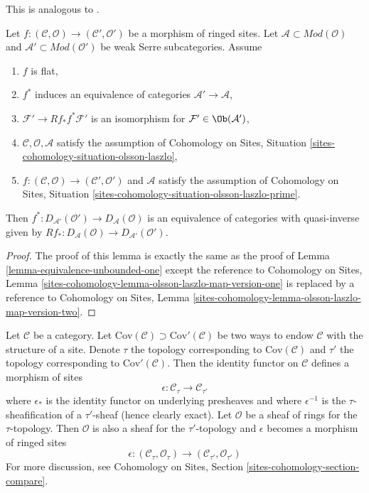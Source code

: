 \begin{lemma}
\label{lemma-equivalence-unbounded-two}
\begin{reference}
This is analogous to \cite[Theorem 2.2.3]{six-I}.
\end{reference}
Let $f : (\mathcal{C}, \mathcal{O}) \to (\mathcal{C}', \mathcal{O}')$
be a morphism of ringed sites.
Let $\mathcal{A} \subset \textit{Mod}(\mathcal{O})$
and $\mathcal{A}' \subset \textit{Mod}(\mathcal{O}')$
be weak Serre subcategories. Assume
\begin{enumerate}
\item $f$ is flat,
\item $f^*$ induces an equivalence of categories
$\mathcal{A}' \to \mathcal{A}$,
\item $\mathcal{F}' \to Rf_*f^*\mathcal{F}'$ is an isomorphism
for $\mathcal{F}' \in \Ob(\mathcal{A}')$,
\item $\mathcal{C}, \mathcal{O}, \mathcal{A}$ satisfy the
assumption of
Cohomology on Sites, Situation \ref{sites-cohomology-situation-olsson-laszlo},
\item $f : (\mathcal{C}, \mathcal{O}) \to (\mathcal{C}', \mathcal{O}')$
and $\mathcal{A}$ satisfy the assumption of
Cohomology on Sites, Situation
\ref{sites-cohomology-situation-olsson-laszlo-prime}.
\end{enumerate}
Then $f^* : D_{\mathcal{A}'}(\mathcal{O}') \to D_\mathcal{A}(\mathcal{O})$
is an equivalence of categories with quasi-inverse given by
$Rf_* : D_\mathcal{A}(\mathcal{O}) \to D_{\mathcal{A}'}(\mathcal{O}')$.
\end{lemma}

\begin{proof}
The proof of this lemma is exactly the same as the proof
of Lemma \ref{lemma-equivalence-unbounded-one}
except the reference to
Cohomology on Sites, Lemma
\ref{sites-cohomology-lemma-olsson-laszlo-map-version-one}
is replaced by a reference to
Cohomology on Sites, Lemma
\ref{sites-cohomology-lemma-olsson-laszlo-map-version-two}.
\end{proof}


\noindent
Let $\mathcal{C}$ be a category. Let
$\text{Cov}(\mathcal{C}) \supset \text{Cov}'(\mathcal{C})$
be two ways to endow $\mathcal{C}$ with the structure of a site.
Denote $\tau$ the topology corresponding to $\text{Cov}(\mathcal{C})$
and $\tau'$ the topology corresponding to $\text{Cov}'(\mathcal{C})$.
Then the identity functor on $\mathcal{C}$ defines a morphism
of sites
$$
\epsilon : \mathcal{C}_\tau \longrightarrow \mathcal{C}_{\tau'}
$$
where $\epsilon_*$ is the identity functor on underlying presheaves and
where $\epsilon^{-1}$ is the $\tau$-sheafification of a $\tau'$-sheaf
(hence clearly exact). Let $\mathcal{O}$ be a sheaf of rings for the
$\tau$-topology. Then $\mathcal{O}$ is also a sheaf for the $\tau'$-topology
and $\epsilon$ becomes a morphism of ringed sites
$$
\epsilon :
(\mathcal{C}_\tau, \mathcal{O}_\tau)
\longrightarrow
(\mathcal{C}_{\tau'}, \mathcal{O}_{\tau'})
$$
For more discussion, see
Cohomology on Sites, Section \ref{sites-cohomology-section-compare}.

